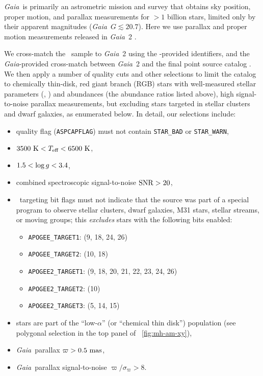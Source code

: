 \documentclass[modern]{aastex63}
\newcommand{\gaia}{\textsl{Gaia}}
\newcommand{\dr}[1]{\acronym{DR}#1}
\newcommand{\apogee}{\acronym{APOGEE}}
\begin{document}
\gaia\ is primarily an astrometric mission and survey
\citep{Gaia-Collaboration:2016} that obtains sky position, proper motion, and
parallax measurements for $>1$ billion stars, limited only by their apparent
magnitudes (\gaia\ $G \lesssim 20.7$).
Here we use parallax and proper motion measurements released in \gaia\ \dr{2}
\citep{Gaia-Collaboration:2018, Gaia-astrometric:2018}.

We cross-match the \apogee\ sample to \gaia\ \dr{2} using the \apogee-provided
 \citep{Skrutskie:2006} identifiers, and the \gaia-provided
cross-match between \gaia\ \dr{2} and the final  point source
catalog \citep{Gaia-crossmatch:2019}.
We then apply a number of quality cuts and other selections to limit the catalog
to chemically thin-disk, red giant branch (RGB) stars with well-measured stellar
parameters (\logg, \Teff) and abundances (the abundance ratios listed above),
high signal-to-noise parallax measurements, but excluding stars targeted in
stellar clusters and dwarf galaxies, as enumerated below.
In detail, our selections include:
\begin{itemize}
  \item {} quality flag (\texttt{ASPCAPFLAG}) must not contain
    \texttt{STAR\_BAD} or \texttt{STAR\_WARN},
  \item $3500~\mathrm{K} < T_{\textrm{eff}} < 6500~\mathrm{K}$,
  \item $1.5 < \log g < 3.4$,
  \item combined spectroscopic signal-to-noise ${\rm SNR} > 20$,
  \item \apogee\ targeting bit flags must not indicate that the source was part
    of a special program to observe stellar clusters, dwarf galaxies, M31 stars,
    stellar streams, or moving groups; this \emph{excludes} stars with the
    following bits enabled:
    \begin{itemize}
      \item \texttt{APOGEE\_TARGET1}: (9, 18, 24, 26)
      \item \texttt{APOGEE\_TARGET2}: (10, 18)
      \item \texttt{APOGEE2\_TARGET1}: (9, 18, 20, 21, 22, 23, 24, 26)
      \item \texttt{APOGEE2\_TARGET2}: (10)
      \item \texttt{APOGEE2\_TARGET3}: (5, 14, 15)
    \end{itemize}
  \item stars are part of the ``low-$\alpha$'' (or ``chemical thin disk'')
    population (see polygonal selection in the top panel of
    \figurename~\ref{fig:mh-am-xy}),
  \item \gaia\ parallax $\varpi > 0.5~\mathrm{mas}$,
  \item \gaia\ parallax signal-to-noise $\varpi / \sigma_\varpi > 8$.
\end{itemize}
\end{document}
